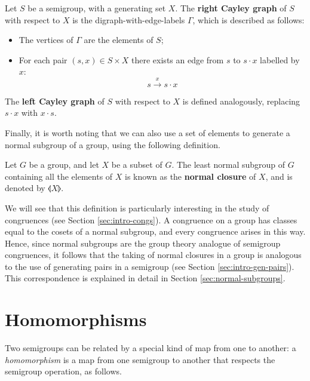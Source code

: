\begin{definition}
  \label{def:cayley-graph}
  Let $S$ be a semigroup, with a generating set $X$.  The \textbf{right Cayley
    graph} of $S$ with respect to $X$ is the digraph-with-edge-labels $\Gamma$,
  which is described as follows:
  \begin{itemize}
  \item The vertices of $\Gamma$ are the elements of $S$;
  \item For each pair $(s, x) \in S \times X$ there exists an edge from $s$ to
    $s \cdot x$ labelled by $x$:
    $$s \overset{x}{\longrightarrow} s \cdot x$$
  \end{itemize}
  The \textbf{left Cayley graph} of $S$ with respect to $X$ is defined
  analogously, replacing $s \cdot x$ with $x \cdot s$.
\end{definition}

Finally, it is worth noting that we can also use a set of elements to generate a
normal subgroup of a group, using the following definition.

\begin{definition}
  \label{def:normal-closure}
  Let $G$ be a group, and let $X$ be a subset of $G$.  The least normal subgroup
  of $G$ containing all the elements of $X$ is known as the \textbf{normal
    closure} of $X$, and is denoted by $\llangle X \rrangle$.
\end{definition}

We will see that this definition is particularly interesting in the study of
congruences (see Section \ref{sec:intro-congs}).  A congruence on a group has
classes equal to the cosets of a normal subgroup, and every congruence arises in
this way.  Hence, since normal subgroups are the group theory analogue of
semigroup congruences, it follows that the taking of normal closures in a group
is analogous to the use of generating pairs in a semigroup (see Section
\ref{sec:intro-gen-pairs}).  This correspondence is explained in detail in
Section \ref{sec:normal-subgroups}.

\section{Homomorphisms}
\label{sec:homomorphisms}

Two semigroups can be related by a special kind of map from one to another: a
\textit{homomorphism} is a map from one semigroup to another that respects the
semigroup operation, as follows.

